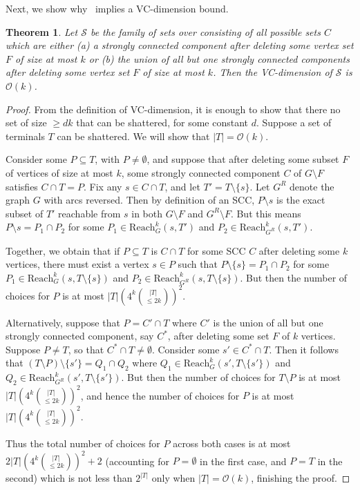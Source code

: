 \documentclass[11pt]{article}
\newtheorem{theorem}{Theorem}[section]
\newcommand{\Reach}{\mathrm{Reach}\xspace}
\renewcommand{\SS}{\mathcal{S}}
\newcommand{\OO}{\mathcal{O}}
\begin{document}
Next, we show why~ implies a VC-dimension bound.

\begin{theorem}
Let $\SS$ be the family of sets over consisting of all possible sets $C$ which are either (a) a strongly connected component after deleting some vertex set $F$ of size at most $k$ or (b) the union of all but one strongly connected components after deleting some vertex set $F$ of size at most $k$. Then the VC-dimension of $\SS$ is $\OO(k)$.
\end{theorem}

\begin{proof}
From the definition of VC-dimension, it is enough to show that there no set of size $\geq dk$ that can be shattered, for some constant $d$. Suppose a set of terminals $T$ can be shattered. We will show that $|T| = \OO(k)$. 

Consider some $P \subseteq T$, with $P \neq \emptyset$, and suppose that after deleting some subset $F$ of vertices of size at most $k$, some strongly connected component $C$ of $G \setminus F$ satisfies $C \cap T = P$. Fix any $s \in C \cap T$, and let $T' = T \setminus \{s\}$. Let $G^R$ denote the graph $G$ with arcs reversed. Then by definition of an SCC, $P \setminus s$ is the exact subset of $T'$ reachable from $s$ in both $G \setminus F$ and $G^R \setminus F$. But this means $P \setminus s = P_1 \cap P_2$ for some $P_1 \in \Reach_G^k(s,T')$ and $P_2 \in \Reach_{G^R}^k(s, T')$.

Together, we obtain that if $P \subseteq T$ is $C \cap T$ for some SCC $C$ after deleting some $k$ vertices, there must exist a vertex $s \in P$ such that $P \setminus \{s\} = P_1 \cap P_2$ for some $P_1 \in \Reach_G^k(s,T \setminus \{s\})$ and $P_2 \in \Reach_{G^R}^k(s, T \setminus \{s\})$. But then the number of choices for $P$ is at most $|T|(4^k {|T| \choose \leq 2k})^2$.




Alternatively, suppose that $P = C' \cap T$ where $C'$ is the union of all but one strongly connected component, say $C^*$, after deleting some set $F$ of $k$ vertices. Suppose $P \neq T$, so that $C^* \cap T \neq \emptyset$. Consider some $s' \in C^* \cap T$. Then it follows that $(T \setminus P) \setminus \{s'\} = Q_1 \cap Q_2$ where $Q_1 \in \Reach^k_{G}(s', T \setminus \{s'\})$ and $Q_2 \in \Reach_{G^R}^k(s', T \setminus \{s'\})$. But then the number of choices for $T \setminus P$ is at most $|T|(4^k {|T| \choose \leq 2k})^2$, and hence the number of choices for $P$ is at most $|T|(4^k {|T| \choose \leq 2k})^2$.


Thus the total number of choices for $P$ across both cases is at most $2|T|(4^k {|T| \choose \leq 2k})^2 + 2$ (accounting for $P = \emptyset$ in the first case, and $P = T$ in the second)
which is not less than $2^{|T|}$ only when $|T| = \OO(k)$, finishing the proof.
\end{proof}
\end{document}
